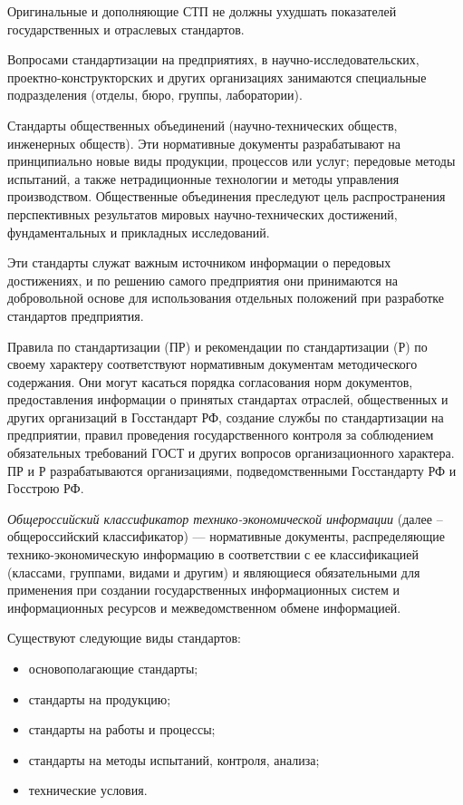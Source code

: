 Оригинальные и дополняющие СТП не должны ухудшать показателей государственных и отраслевых стандартов.

Вопросами стандартизации на предприятиях, в научно-исследовательских, проектно-конст\-рук\-торс\-ких и других организациях занимаются специальные подразделения (отделы, бюро, группы, лаборатории).

Стандарты общественных объединений (научно-технических обществ, инженерных обществ). Эти нормативные документы разрабатывают на принципиально новые виды продукции, процессов или услуг; передовые методы испытаний, а также нетрадиционные технологии и методы управления производством. Общественные объединения преследуют цель распространения перспективных результатов мировых научно-технических достижений, фундаментальных и прикладных исследований.

Эти стандарты служат важным источником информации о передовых достижениях, и по решению самого предприятия они принимаются на добровольной основе для использования отдельных положений при разработке стандартов предприятия.

Правила по стандартизации (ПР) и рекомендации по стандартизации (Р) по своему характеру соответствуют нормативным документам методического содержания. Они могут касаться порядка согласования норм документов, предоставления информации о принятых стандартах отраслей, общественных и других организаций в Госстандарт РФ, создание службы по стандартизации на предприятии, правил проведения государственного контроля за соблюдением обязательных требований ГОСТ и других вопросов организационного характера. ПР и Р разрабатываются организациями, подведомственными Госстандарту РФ и Госстрою РФ.

\textit{Общероссийский классификатор технико-экономической информации} (далее -- общероссийский классификатор) --- нормативные документы, распределяющие технико-экономическую информацию в соответствии с ее классификацией (классами, группами, видами и другим) и являющиеся обязательными для применения при создании государственных информационных систем и информационных ресурсов и межведомственном обмене информацией.

Существуют следующие виды стандартов:
\begin{itemize}
\item основополагающие стандарты;
\item стандарты на продукцию;
\item стандарты на работы и процессы;
\item стандарты на методы испытаний, контроля, анализа;
\item технические условия.
\end{itemize}

